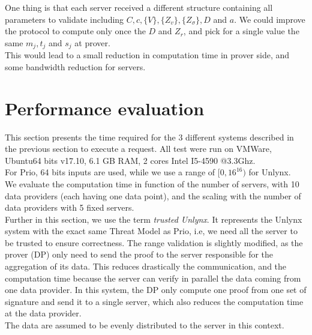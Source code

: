 \documentclass{article}
\begin{document}
One thing is that each server received a different structure containing all parameters to validate including $C, c, \{V\}, \{Z_v\} ,\{ Z_{\sigma}\}, D $ and $a$. We could improve the protocol to compute only once the $D$ and $Z_r$, and pick for a single value the same $m_j, t_j$ and $s_j$ at prover.\\
This would lead to a small reduction in computation time in prover side, and some bandwidth reduction for servers.

\section{Performance evaluation}

This section presents the time required for the 3 different systems described in the previous section to execute a request. All test were run on VMWare, Ubuntu64 bits v17.10, 6.1 GB RAM, 2 cores Intel I5-4590 @3.3Ghz.\\
For Prio, 64 bits inputs are used, while we use a range of $[0,16^{16})$ for Unlynx.\\
We evaluate the computation time in function of the number of servers, with 10 data providers (each having one data point), and the scaling with the number of data providers with 5 fixed servers.\\

Further in this section, we use the term \textit{trusted Unlynx}. 
It represents the Unlynx system with the exact same Threat Model as Prio, i.e, we need all the server to be trusted to ensure correctness. The range validation is slightly modified, as the prover (DP) only need to send the proof to the server responsible for the aggregation of its data. This reduces drastically the communication, and the computation time because the server can verify in parallel the data coming from one data provider. In this system, the DP only compute one proof from one set of signature and send it to a single server, which also reduces the computation time at the data provider.\\
The data are assumed to be evenly distributed to the server in this context.
\end{document}
